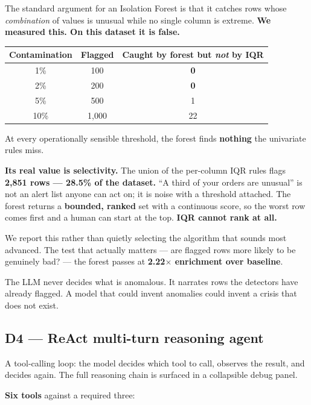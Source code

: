 \documentclass[11pt,a4paper]{article}
\begin{document}
The standard argument for an Isolation Forest is that it catches rows whose
\emph{combination} of values is unusual while no single column is extreme. \textbf{We
measured this. On this dataset it is false.}

\begin{center}
\begin{tabular}{@{}ccc@{}}
\toprule
\textbf{Contamination} & \textbf{Flagged} & \textbf{Caught by forest but \emph{not} by IQR} \\
\midrule
1\%  & 100   & \textbf{0} \\
2\%  & 200   & \textbf{0} \\
5\%  & 500   & 1 \\
10\% & 1,000 & 22 \\
\bottomrule
\end{tabular}
\end{center}

At every operationally sensible threshold, the forest finds \textbf{nothing} the
univariate rules miss.

\textbf{Its real value is selectivity.} The union of the per-column IQR rules flags
\textbf{2,851 rows --- 28.5\% of the dataset.} ``A third of your orders are unusual'' is
not an alert list anyone can act on; it is noise with a threshold attached. The forest
returns a \textbf{bounded, ranked} set with a continuous score, so the worst row comes
first and a human can start at the top. \textbf{IQR cannot rank at all.}

We report this rather than quietly selecting the algorithm that sounds most advanced.
The test that actually matters --- are flagged rows more likely to be genuinely bad? ---
the forest passes at \textbf{2.22$\times$ enrichment over baseline}.

The LLM never decides what is anomalous. It narrates rows the detectors have already
flagged. A model that could invent anomalies could invent a crisis that does not exist.

\subsection{D4 --- ReAct multi-turn reasoning agent}
\label{sec:agent}

A tool-calling loop: the model decides which tool to call, observes the result, and
decides again. The full reasoning chain is surfaced in a collapsible debug panel.

\textbf{Six tools} against a required three:
\end{document}
